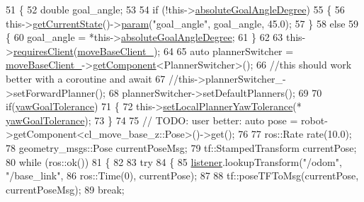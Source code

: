 \begin{DoxyCode}
51 \{
52     \textcolor{keywordtype}{double} goal\_angle;
53 
54     \textcolor{keywordflow}{if} (!this->\hyperlink{classcl__move__base__z_1_1CbAbsoluteRotate_ad5d0e21549940444e1cb525cda73329a}{absoluteGoalAngleDegree})
55     \{
56         this->\hyperlink{classsmacc_1_1SmaccClientBehavior_abf6773e4dd948f932f11a346dd6e7c2c}{getCurrentState}()->\hyperlink{classsmacc_1_1ISmaccState_a4982f2187ed6da337462721146e8ef70}{param}(\textcolor{stringliteral}{"goal\_angle"}, goal\_angle, 45.0);
57     \}
58     \textcolor{keywordflow}{else}
59     \{
60         goal\_angle = *this->\hyperlink{classcl__move__base__z_1_1CbAbsoluteRotate_ad5d0e21549940444e1cb525cda73329a}{absoluteGoalAngleDegree};
61     \}
62 
63     this->\hyperlink{classsmacc_1_1SmaccClientBehavior_a917f001e763a1059af337bf4e164f542}{requiresClient}(\hyperlink{classcl__move__base__z_1_1CbAbsoluteRotate_a8ddbef73316ff96f30493b28b5627e35}{moveBaseClient\_});
64 
65     \textcolor{keyword}{auto} plannerSwitcher = \hyperlink{classcl__move__base__z_1_1CbAbsoluteRotate_a8ddbef73316ff96f30493b28b5627e35}{moveBaseClient\_}->\hyperlink{classsmacc_1_1ISmaccClient_adef78db601749ca63c19e74a27cb88cc}{getComponent}<PlannerSwitcher>();
66     \textcolor{comment}{//this should work better with a coroutine and await}
67     \textcolor{comment}{//this->plannerSwitcher\_->setForwardPlanner();}
68     plannerSwitcher->setDefaultPlanners();
69 
70     \textcolor{keywordflow}{if}(\hyperlink{classcl__move__base__z_1_1CbAbsoluteRotate_a8d8b5b9c2c821efe101bb07c96c4bdd3}{yawGoalTolerance})
71     \{
72         this->\hyperlink{classcl__move__base__z_1_1CbAbsoluteRotate_aba8d93d615ccd43acd0684f8e88e2209}{setLocalPlannerYawTolerance}(*
      \hyperlink{classcl__move__base__z_1_1CbAbsoluteRotate_a8d8b5b9c2c821efe101bb07c96c4bdd3}{yawGoalTolerance});
73     \}
74   
75     \textcolor{comment}{// TODO: user better:   auto pose = robot->getComponent<cl\_move\_base\_z::Pose>()->get();}
76 
77     ros::Rate rate(10.0);
78     geometry\_msgs::Pose currentPoseMsg;
79     tf::StampedTransform currentPose;
80     \textcolor{keywordflow}{while} (ros::ok())
81     \{
82         
83         \textcolor{keywordflow}{try}
84         \{
85             \hyperlink{classcl__move__base__z_1_1CbAbsoluteRotate_ad946bb6486dc35baf03ec1cc430a3406}{listener}.lookupTransform(\textcolor{stringliteral}{"/odom"}, \textcolor{stringliteral}{"/base\_link"},
86                                      ros::Time(0), currentPose);
87 
88             tf::poseTFToMsg(currentPose, currentPoseMsg);
89             \textcolor{keywordflow}{break};

\end{DoxyCode}
